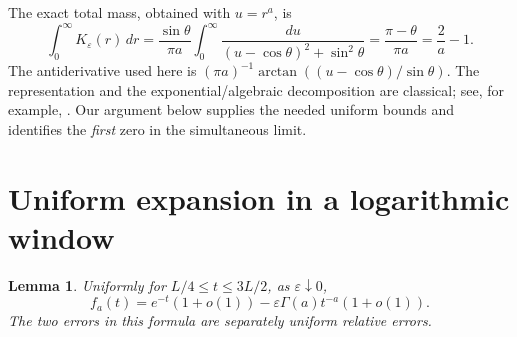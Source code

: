 \documentclass[11pt]{article}
\newtheorem{lemma}{Lemma}
\begin{document}
The exact total mass, obtained with $u=r^a$, is
\begin{equation}\label{mass}
 \int_0^\infty K_\varepsilon(r)\,dr
 =\frac{\sin\theta}{\pi a}\int_0^\infty
      \frac{du}{(u-\cos\theta)^2+\sin^2\theta}
 =\frac{\pi-\theta}{\pi a}=\frac2a-1.
\end{equation}
The antiderivative used here is
$(\pi a)^{-1}\arctan((u-\cos\theta)/\sin\theta)$.
The representation and the exponential/algebraic decomposition are
classical; see, for example, \cite{Hanneken,Paris02,Paris21}.
Our argument below supplies the needed uniform bounds and identifies
the \emph{first} zero in the simultaneous limit.

\section*{Uniform expansion in a logarithmic window}
\begin{lemma}\label{window}
Uniformly for $L/4\leq t\leq3L/2$, as $\varepsilon\downarrow0$,
\begin{equation}\label{uniform}
 f_a(t)=e^{-t}(1+o(1))
             -\varepsilon\Gamma(a)t^{-a}(1+o(1)).
\end{equation}
The two errors in this formula are separately uniform relative errors.
\end{lemma}
\end{document}
